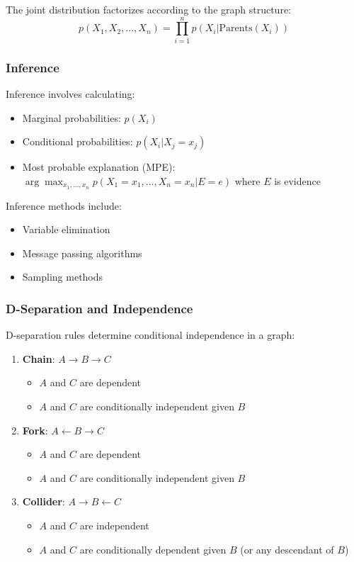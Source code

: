 \documentclass{article}
\begin{document}
The joint distribution factorizes according to the graph structure:
\begin{equation}
    p(X_1, X_2, ..., X_n) = \prod_{i=1}^{n} p(X_i | \text{Parents}(X_i))
\end{equation}

\subsubsection{Inference}
Inference involves calculating:
\begin{itemize}
    \item Marginal probabilities: $p(X_i)$
    \item Conditional probabilities: $p(X_i | X_j = x_j)$
    \item Most probable explanation (MPE): $\arg\max_{x_1,...,x_n} p(X_1=x_1,...,X_n=x_n | E=e)$ where $E$ is evidence
\end{itemize}

Inference methods include:
\begin{itemize}
    \item Variable elimination
    \item Message passing algorithms
    \item Sampling methods
\end{itemize}

\subsubsection{D-Separation and Independence}
D-separation rules determine conditional independence in a graph:
\begin{enumerate}
    \item \textbf{Chain}: $A \rightarrow B \rightarrow C$
    \begin{itemize}
        \item $A$ and $C$ are dependent
        \item $A$ and $C$ are conditionally independent given $B$
    \end{itemize}
    
    \item \textbf{Fork}: $A \leftarrow B \rightarrow C$
    \begin{itemize}
        \item $A$ and $C$ are dependent
        \item $A$ and $C$ are conditionally independent given $B$
    \end{itemize}
    
    \item \textbf{Collider}: $A \rightarrow B \leftarrow C$
    \begin{itemize}
        \item $A$ and $C$ are independent
        \item $A$ and $C$ are conditionally dependent given $B$ (or any descendant of $B$)
    \end{itemize}
\end{enumerate}
\end{document}
